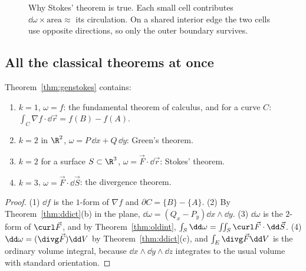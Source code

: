 \begin{figure}[ht]
\centering
{}
\caption{Why Stokes' theorem is true. Each small cell contributes $\dd\omega\times\text{area}\approx$ its circulation. On a shared interior edge the two cells use opposite directions, so only the outer boundary survives.}
\label{fig:stokescells}
\end{figure}

\subsection{All the classical theorems at once}

\begin{theorem}\label{thm:special}
Theorem~\ref{thm:genstokes} contains:
\begin{enumerate}[label=(\arabic*)]
  \item $k=1$, $\omega=f$: the fundamental theorem of calculus, and for a curve $C$: $\int_C\nabla f\cdot\dd\vec r=f(B)-f(A)$.
  \item $k=2$ in $\R^2$, $\omega=P\,\dd x+Q\,\dd y$: Green's theorem.
  \item $k=2$ for a surface $S\subset\R^3$, $\omega=\vec F\cdot\dd\vec r$: Stokes' theorem.
  \item $k=3$, $\omega=\vec F\cdot\dd\vec S$: the divergence theorem.
\end{enumerate}
\end{theorem}

\begin{proof}
(1) $\dd f$ is the $1$-form of $\nabla f$ and $\partial C=\{B\}-\{A\}$. (2) By Theorem~\ref{thm:ddict}(b) in the plane, $\dd\omega=(Q_x-P_y)\dd x\wedge\dd y$. (3) $\dd\omega$ is the $2$-form of $\curl\vec F$, and by Theorem~\ref{thm:oldint}, $\int_S\dd\omega=\iint_S\curl\vec F\cdot\dd\vec S$. (4) $\dd\omega=(\divg\vec F)\dd V$ by Theorem~\ref{thm:ddict}(c), and $\int_E\divg\vec F\dd V$ is the ordinary volume integral, because $\dd x\wedge\dd y\wedge\dd z$ integrates to the usual volume with standard orientation.
\end{proof}

